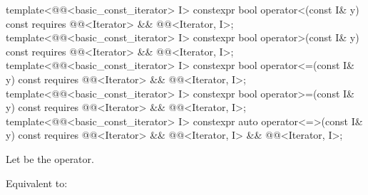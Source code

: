 %
%
%
%
%
\begin{itemdecl}
template<@@<basic_const_iterator> I>
  constexpr bool operator<(const I& y) const
    requires @@<Iterator> && @@<Iterator, I>;
template<@@<basic_const_iterator> I>
  constexpr bool operator>(const I& y) const
    requires @@<Iterator> && @@<Iterator, I>;
template<@@<basic_const_iterator> I>
  constexpr bool operator<=(const I& y) const
    requires @@<Iterator> && @@<Iterator, I>;
template<@@<basic_const_iterator> I>
  constexpr bool operator>=(const I& y) const
    requires @@<Iterator> && @@<Iterator, I>;
template<@@<basic_const_iterator> I>
  constexpr auto operator<=>(const I& y) const
    requires @@<Iterator> && @@<Iterator, I> &&
             @@<Iterator, I>;
\end{itemdecl}

\begin{itemdescr}
\pnum
Let  be the operator.

\pnum
\effects
Equivalent to: 
\end{itemdescr}

